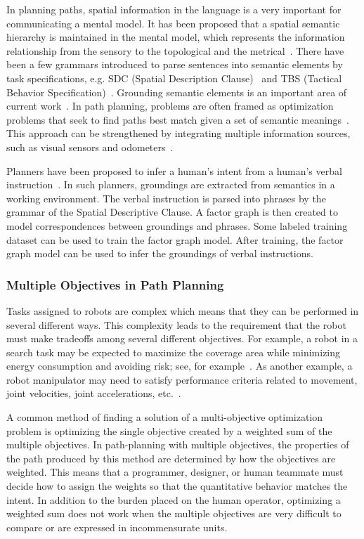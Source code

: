 \documentclass[phd]{byuprop}
\begin{document}
In planning paths, spatial information in the language is a very important for communicating a mental model.
It has been proposed that a spatial semantic hierarchy is maintained in the mental model, which represents the information relationship from the sensory to the topological and the metrical~\cite{kuipers1999}.
There have been a few grammars introduced to parse sentences into semantic elements by task specifications, e.g. SDC (Spatial Description Clause)~\cite{tellex2011understanding} and TBS (Tactical Behavior Specification)~\cite{Boularias_2015_7953}.
Grounding semantic elements is an important area of current work~\cite{Kollar:2010:TUN:1734454.1734553}.
In path planning, problems are often framed as optimization problems that seek to find paths best match given a set of semantic meanings~\cite{tellex2011understanding,Boularias_2015_7953}.
This approach can be strengthened by integrating multiple information sources, such as visual sensors and odometers~\cite{6696569}.

Planners have been proposed to infer a human's intent from a human's verbal instruction~\cite{howard2014natural,Duvallet2014}.
In such planners, groundings are extracted from semantics in a working environment.
The verbal instruction is parsed into phrases by the grammar of the Spatial Descriptive Clause. 
A factor graph is then created to model correspondences between groundings and phrases.
Some labeled training dataset can be used to train the factor graph model.
After training, the factor graph model can be used to infer the groundings of verbal instructions.

\subsubsection{Multiple Objectives in Path Planning}
\label{sec:related_work:algorithm_specific_work:multiple_objectives_in_path_planning}

Tasks assigned to robots are complex which means that they can be performed in several different ways.
This complexity leads to the requirement that the robot must make tradeoffs among several different objectives.
For example, a robot in a search task may be expected to maximize the coverage area while minimizing energy consumption and avoiding risk; see, for example~\cite{Mei2005,Yi2014}. 
As another example, a robot manipulator may need to satisfy performance criteria related to movement, joint velocities, joint accelerations, etc.~\cite{Pires2004}.

A common method of finding a solution of a multi-objective optimization problem is optimizing the single objective created by a weighted sum of the multiple objectives.  
In path-planning with multiple objectives, the properties of the path produced by this method are determined by how the objectives are weighted. 
This means that a programmer, designer, or human teammate must decide how to assign the weights so that the quantitative behavior matches the intent.  
In addition to the burden placed on the human operator, optimizing a weighted sum does not work when the multiple objectives are very difficult to compare or are expressed in incommensurate units.
\end{document}
